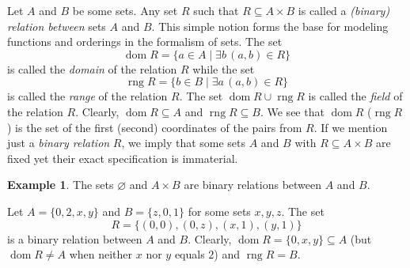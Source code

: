 \documentclass[12pt,notitlepage]{article}
\theoremstyle{plain}
\theoremstyle{definition}
\newtheorem{exm}[thm]{Example}
\theoremstyle{plain}
\newcommand{\sbs}{\subseteq}
\newcommand{\void}{\varnothing}
\newcommand{\dom}{\mathop{\mathrm{dom}}}
\newcommand{\rng}{\mathop{\mathrm{rng}}}
\newcommand{\1}{\mathbf{1}}
\newcommand{\0}{\mathbf{0}}
\newcommand{\mcomm}[1]{}
\begin{document}
Let $A$ and $B$ be some sets. Any set $R$ such that $R \sbs A \times B$ is called a \emph{(binary) relation between} sets $A$ and $B$. This simple notion forms the base for modeling functions and orderings in the formalism of sets. The set
$$\dom R = \{a \in A \mid \exists b\, (a, b) \in R \}$$
is called the \emph{domain} of the relation $R$ while the set
$$\rng R = \{b \in B \mid \exists a\, (a, b) \in R \}$$
is called the \emph{range} of the relation $R$. The set $\dom R \cup \rng R$ is called the \emph{field} of the relation $R$. Clearly, $\dom R \sbs A$ and $\rng R \sbs B$. We see that $\dom R$ ($\rng R$) is the set of the first (second) coordinates of the pairs from $R$. If we mention just a \emph{binary relation} $R$, we imply that some sets $A$ and $B$ with $R \sbs A \times B$ are fixed yet their exact specification is immaterial.

\mcomm{We prefer this `parametric' definition to the more natural one (where every set $R$ of ordered pairs is called a relation) since the latter would require taking ${\cup} {\cup} R$ for the relation's field, whereas we want to avoid infinite unions generally.}

\begin{exm}\label{rel:exm_rel}
The sets $\void$ and $A \times B$ are binary relations between $A$ and $B$.

Let $A = \{0,2, x, y\}$ and $B = \{z, 0, 1\}$ for some sets $x, y, z$. The set
$$R = \{ (0, 0), (0,z), (x, 1), (y,1) \}$$
is a binary relation between $A$ and $B$. Clearly, $\dom R = \{0,x,y\} \sbs A$ (but $\dom R \neq A$ when neither $x$ nor $y$ equals $2$) and $\rng R = B$.
\end{exm}
\end{document}
